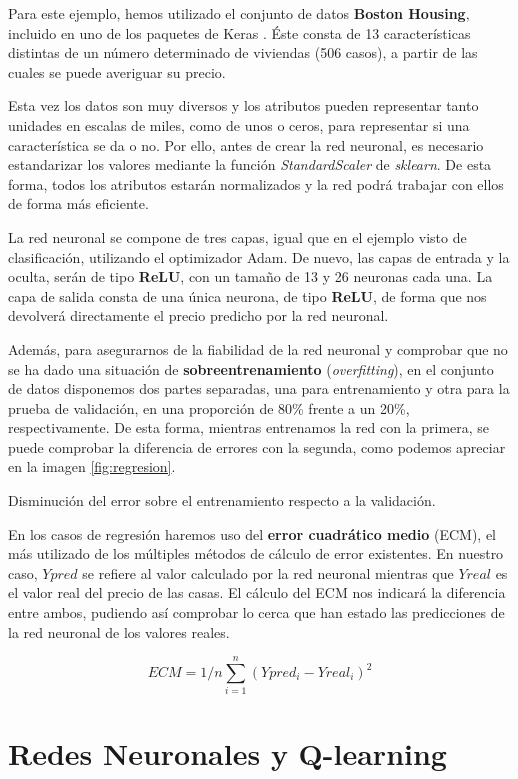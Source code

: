 Para este ejemplo, hemos utilizado el conjunto de datos \textbf{Boston Housing}, incluido en uno de los paquetes de Keras \citep{BostonKeras}. Éste consta de 13 características distintas de un número determinado de viviendas (506 casos), a partir de las cuales se puede averiguar su precio. 

Esta vez los datos son muy diversos y los atributos pueden representar tanto unidades en escalas de miles, como de unos o ceros, para representar si una característica se da o no. Por ello, antes de crear la red neuronal, es necesario estandarizar los valores mediante la función \textit{StandardScaler} de \textit{sklearn}. De esta forma, todos los atributos estarán normalizados y la red podrá trabajar con ellos de forma más eficiente.

La red neuronal se compone de tres capas, igual que en el ejemplo visto de clasificación, utilizando el optimizador Adam. De nuevo, las capas de entrada y la oculta, serán de tipo \textbf{ReLU}, con un tamaño de 13 y 26 neuronas cada una. La capa de salida consta de una única neurona, de tipo \textbf{ReLU}, de forma que nos devolverá directamente el precio predicho por la red neuronal. 

Además, para asegurarnos de la fiabilidad de la red neuronal y comprobar que no se ha dado una situación de \textbf{sobreentrenamiento} (\textit{overfitting}), en el conjunto de datos disponemos dos partes separadas, una para entrenamiento y otra para la prueba de validación, en una proporción de 80\% frente a un 20\%, respectivamente. De esta forma, mientras entrenamos la red con la primera, se puede comprobar la diferencia de errores con la segunda, como podemos apreciar en la imagen \ref{fig:regresion}.

%
       {Disminución del error sobre el entrenamiento respecto a la validación.} 

En los casos de regresión haremos uso del \textbf{error cuadrático medio} (ECM), el más utilizado de los múltiples métodos de cálculo de error existentes. En nuestro caso, $Ypred$ se refiere al valor calculado por la red neuronal mientras que $Yreal$ es el valor real del precio de las casas. El cálculo del ECM nos indicará la diferencia entre ambos, pudiendo así comprobar lo cerca que han estado las predicciones de la red neuronal de los valores reales.

$$ECM = 1/n \sum^n_{i=1}(Ypred_i - Yreal_i)^2$$

\section{Redes Neuronales y Q-learning}

